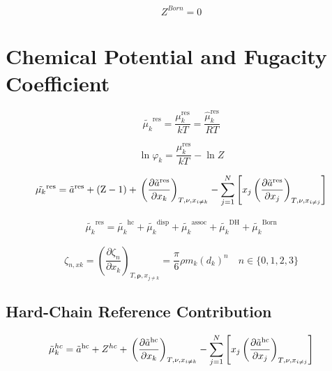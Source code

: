 \documentclass[12pt, letterpaper]{article}
\begin{document}
\begin{equation}
Z^{Born}= 0
\end{equation}

\section{Chemical Potential and Fugacity Coefficient}

\cite{Gross2001}

\begin{equation}
\tilde{\mu_{k}}^{\mathrm{res}}=\frac{\mu_k^\mathrm{res}}{kT} = \frac{\hat{\mu}_k^\mathrm{res}}{RT}
\end{equation}

\begin{equation}
\ln\varphi_k=\frac{\mu_k^\mathrm{res}}{kT}-\ln Z
\end{equation}

\begin{equation}
\tilde{\mu_{k}}^{\mathrm{res}}=\tilde{a}^{\mathrm{res}}+(\mathrm{Z}-1)+\\\left(\frac{\partial\tilde{a}^{\mathrm{res}}}{\partial x_{k}}\right)_{T,\nu,x_{i\neq k}}-\sum_{j=1}^{N}\left[x_{j}\left(\frac{\partial\tilde{a}^{\mathrm{res}}}{\partial x_{j}}\right)_{T,\nu,x_{i\neq j}}\right]
\end{equation}

\begin{align}
\tilde{\mu_{k}}^{\mathrm{res}}=\tilde{\mu_{k}}^{\mathrm{hc}}+\tilde{\mu_{k}}^{\mathrm{disp}}+\tilde{\mu_{k}}^{\mathrm{assoc}}+\tilde{\mu_{k}}^{\mathrm{DH}}+\tilde{\mu_{k}}^{\mathrm{Born}}
\end{align}

\begin{equation}
\zeta_{n,xk}=\left(\frac{\partial\zeta_{n}}{\partial x_{k}}\right)_{T,\boldsymbol{\rho},x_{j\neq k}}=\frac{\pi}{6}\rho m_{k}(d_{k})^{n}\quad n\in\{0,1,2,3\}
\end{equation}

\subsection{Hard-Chain Reference Contribution}

\cite{Gross2001}

\begin{equation}
\tilde{\mu}^{hc}_k = \tilde{a}^{\mathrm{hc}} + Z^{hc} + \\\left(\frac{\partial\tilde{a}^{\mathrm{hc}}}{\partial x_{k}}\right)_{T,\nu,x_{i\neq k}}-\sum_{j=1}^{N}\left[x_{j}\left(\frac{\partial\tilde{a}^{\mathrm{hc}}}{\partial x_{j}}\right)_{T,\nu,x_{i\neq j}}\right]
\end{equation}
\end{document}
